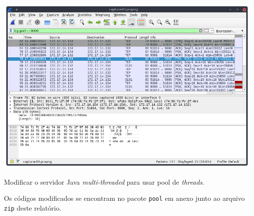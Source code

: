 \documentclass[a4paper, 12pt, answers]{exam}
\begin{document}
\begin{questions}
\begin{parts}
\begin{solution}
        \includegraphics[width=\linewidth]{wireshark-03.png}
      \end{solution}
    \end{parts}
    
    \question
    Modificar o servidor Java \emph{multi-threaded} para usar pool de \emph{threads}.
    
    \begin{solution}
      Os códigos modificados se encontram no pacote \verb|pool| em anexo junto
      ao arquivo \verb|zip| deste relatório.
    \end{solution}
  \end{questions}
\end{document}
